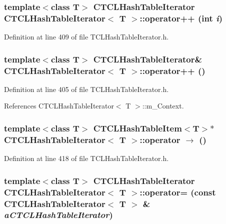 \subsubsection{\setlength{\rightskip}{0pt plus 5cm}template$<$class T$>$ CTCLHash\-Table\-Iterator CTCLHash\-Table\-Iterator$<$ T $>$::operator++ (int {\em i})\hspace{0.3cm}{\tt  [inline]}}\label{classCTCLHashTableIterator_a12}




Definition at line 409 of file TCLHash\-Table\-Iterator.h.
\subsubsection{\setlength{\rightskip}{0pt plus 5cm}template$<$class T$>$ CTCLHash\-Table\-Iterator\& CTCLHash\-Table\-Iterator$<$ T $>$::operator++ ()\hspace{0.3cm}{\tt  [inline]}}\label{classCTCLHashTableIterator_a11}




Definition at line 405 of file TCLHash\-Table\-Iterator.h.

References CTCLHash\-Table\-Iterator$<$ T $>$::m\_\-Context.
\subsubsection{\setlength{\rightskip}{0pt plus 5cm}template$<$class T$>$ {\bf CTCLHash\-Table\-Item}$<$T$>$$\ast$ CTCLHash\-Table\-Iterator$<$ T $>$::operator $\rightarrow$  ()\hspace{0.3cm}{\tt  [inline]}}\label{classCTCLHashTableIterator_a14}




Definition at line 418 of file TCLHash\-Table\-Iterator.h.
\subsubsection{\setlength{\rightskip}{0pt plus 5cm}template$<$class T$>$ CTCLHash\-Table\-Iterator CTCLHash\-Table\-Iterator$<$ T $>$::operator= (const CTCLHash\-Table\-Iterator$<$ T $>$ \& {\em a\-CTCLHash\-Table\-Iterator})\hspace{0.3cm}{\tt  [inline]}}\label{classCTCLHashTableIterator_a3}




